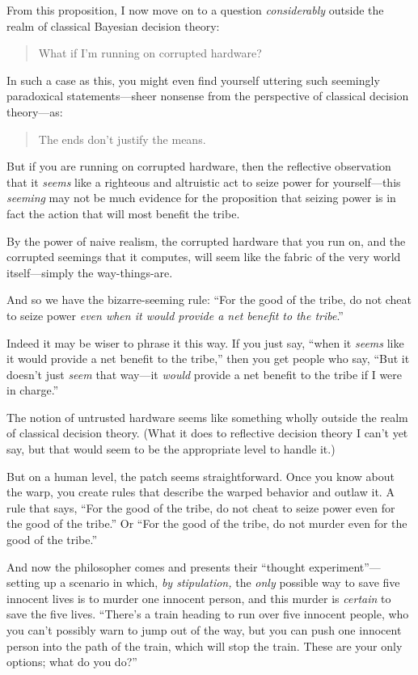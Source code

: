 From this proposition, I now move on to a question
\textit{considerably} outside the realm of classical Bayesian decision
theory:

\begin{quote}
{
  What if I'm running on corrupted hardware?}
\end{quote}


 In such a case as this, you might even find yourself uttering such
seemingly paradoxical statements---sheer nonsense from the perspective
of classical decision theory---as:

\begin{quote}
{
  The ends don't justify the means.}
\end{quote}


 But if you are running on corrupted hardware, then the reflective
observation that it \textit{seems} like a righteous and altruistic act
to seize power for yourself---this \textit{seeming} may not be much
evidence for the proposition that seizing power is in fact the action
that will most benefit the tribe.


 By the power of naive realism, the corrupted hardware that you run
on, and the corrupted seemings that it computes, will seem like the
fabric of the very world itself---simply the way-things-are.

{
 And so we have the bizarre-seeming rule: ``For
the good of the tribe, do not cheat to seize power \textit{even when it
would provide a net benefit to the tribe}.''}


 Indeed it may be wiser to phrase it this way. If you just say,
``when it \textit{seems} like it would provide a net
benefit to the tribe,'' then you get people who say,
``But it doesn't just \textit{seem}
that way---it \textit{would} provide a net benefit to the tribe if I
were in charge.''


 The notion of untrusted hardware seems like something wholly
outside the realm of classical decision theory. (What it does to
reflective decision theory I can't yet say, but that
would seem to be the appropriate level to handle it.)


 But on a human level, the patch seems straightforward. Once you
know about the warp, you create rules that describe the warped behavior
and outlaw it. A rule that says, ``For the good of the
tribe, do not cheat to seize power even for the good of the
tribe.'' Or ``For the good of the
tribe, do not murder even for the good of the
tribe.''


 And now the philosopher comes and presents their
``thought experiment''---setting up
a scenario in which, \textit{by stipulation,} the \textit{only}
possible way to save five innocent lives is to murder one innocent
person, and this murder is \textit{certain} to save the five lives.
``There's a train heading to run over
five innocent people, who you can't possibly warn to
jump out of the way, but you can push one innocent person into the path
of the train, which will stop the train. These are your only options;
what do you do?''



